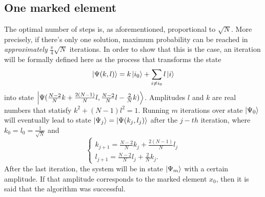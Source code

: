 \documentclass[../../dissertation.tex]{subfiles}
\begin{document}
\subsection{One marked element}
The optimal number of steps is, as aforementioned, proportional to $\sqrt{N}$.
More precisely, if there's only one solution, maximum probability can be
reached in \textit{approximately} $\frac{\pi}{4}\sqrt{N}$ iterations. In order
to show that this is the case, an iteration will be formally defined here as
the process that transforms the state
\begin{equation}
	\ket{\Psi(k,l)} = k\ket{i_0} + \sum_{i\neq i_0}l\ket{i}
	\label{eq:groverQuantumRegister}
\end{equation}
into state $\ket{\Psi(\frac{N-2}{N}k + \frac{2(N-1)}{N}l, \frac{N-2}{N}l -
\frac{2}{N}k)}$. Amplitudes $l$ and $k$ are real numbers that statisfy $k^2 +
(N-1)l^2=1$. Running $m$ iterations over state $\ket{\Psi_0}$ will eventually
lead to state $\ket{\Psi_j} = \ket{\Psi(k_j,l_j)}$ after the $j-th$ iteration,
where $k_0 = l_0 = \frac{1}{\sqrt{N}}$ and
\begin{equation}
	\begin{cases}
		k_{j+1} = \frac{N-2}{N}k_j + \frac{2(N-1)}{N}l_j
		\\l_{j+1} = \frac{N-2}{N}l_j + \frac{2}{N}k_j.
	\end{cases}\label{eq:groverKandJ1}
\end{equation}
After the last iteration, the system will be in state $\ket{\Psi_m}$ with a
certain amplitude. If that amplitude corresponds to the marked element $x_0$,
then it is said that the algorithm was successful.\par 
\end{document}
